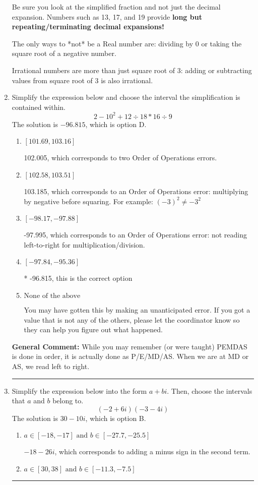 \documentclass{extbook}[14pt]
\newcommand{\litem}[1]{\item #1

\rule{\textwidth}{0.4pt}}
\begin{document}
\begin{enumerate}
{ Be sure you look at the simplified fraction and not just the decimal expansion. Numbers such as 13, 17, and 19 provide \textbf{long but repeating/terminating decimal expansions!} 
 
 The only ways to *not* be a Real number are: dividing by 0 or taking the square root of a negative number. 
 
 Irrational numbers are more than just square root of 3: adding or subtracting values from square root of 3 is also irrational.
}
\litem{
Simplify the expression below and choose the interval the simplification is contained within.
\[ 2 - 10^2 + 12 \div 18 * 16 \div 9 \]The solution is \( -96.815 \), which is option D.\begin{enumerate}[label=\Alph*.]
\item \( [101.69, 103.16] \)

 102.005, which corresponds to two Order of Operations errors.
\item \( [102.58, 103.51] \)

 103.185, which corresponds to an Order of Operations error: multiplying by negative before squaring. For example: $(-3)^2 \neq -3^2$
\item \( [-98.17, -97.88] \)

 -97.995, which corresponds to an Order of Operations error: not reading left-to-right for multiplication/division.
\item \( [-97.84, -95.36] \)

* -96.815, this is the correct option
\item \( \text{None of the above} \)

 You may have gotten this by making an unanticipated error. If you got a value that is not any of the others, please let the coordinator know so they can help you figure out what happened.
\end{enumerate}

\textbf{General Comment:} While you may remember (or were taught) PEMDAS is done in order, it is actually done as P/E/MD/AS. When we are at MD or AS, we read left to right.
}
\litem{
Simplify the expression below into the form $a+bi$. Then, choose the intervals that $a$ and $b$ belong to.
\[ (-2 + 6 i)(-3 - 4 i) \]The solution is \( 30 - 10 i \), which is option B.\begin{enumerate}[label=\Alph*.]
\item \( a \in [-18, -17] \text{ and } b \in [-27.7, -25.5] \)

 $-18 - 26 i$, which corresponds to adding a minus sign in the second term.
\item \( a \in [30, 38] \text{ and } b \in [-11.3, -7.5] \)


\end{enumerate}}
\end{enumerate}
\end{document}
